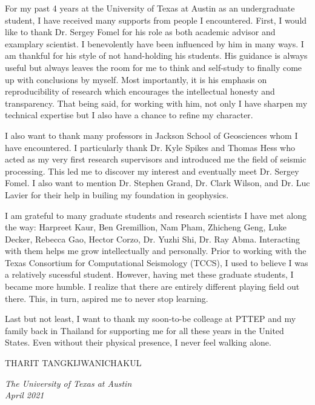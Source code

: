 For my past 4 years at the University of Texas at Austin as an undergraduate student, I have received many supports from people I encountered. First, I would like to thank Dr. Sergey Fomel for his role as both academic advisor and examplary scientist. I benevolently have been influenced by him in many ways. I am thankful for his style of not hand-holding his students. His guidance is always useful but always leaves the room for me to think and self-study to finally come up with conclusions by myself. Most importantly, it is his emphasis on reproducibility of research which encourages the intellectual honesty and transparency. That being said, for working with him, not only I have sharpen my technical expertise but I also have a chance to refine my character.

I also want to thank many professors in Jackson School of Geosciences whom I have encountered. I particularly thank Dr. Kyle Spikes and Thomas Hess who acted as my very first research supervisors and introduced me the field of seismic processing. This led me to discover my interest and eventually meet Dr. Sergey Fomel. I also want to mention Dr. Stephen Grand, Dr. Clark Wilson, and Dr. Luc Lavier for their help in builing my foundation in geophysics.

I am grateful to many graduate students and research scientists I have met along the way: Harpreet Kaur, Ben Gremillion, Nam Pham, Zhicheng Geng, Luke Decker, Rebecca Gao, Hector Corzo, Dr. Yuzhi Shi, Dr. Ray Abma. Interacting with them helps me grow intellectually and personally. Prior to working with the  Texas  Consortium for Computational  Seismology (TCCS), I used to believe I was a relatively sucessful student. However, having met these graduate students, I became more humble. I realize that there are entirely different playing field out there. This, in turn, aspired me to never stop learning.

Last but not least, I want to thank my soon-to-be colleage at PTTEP and my family back in Thailand for supporting me for all these years in the United States. Even without their physical presence, I never feel walking alone. 


\begin{flushright}
THARIT TANGKIJWANICHAKUL
\end{flushright}

\noindent \emph{The University of Texas at Austin}\\
\noindent \emph{April 2021} \\ \\

